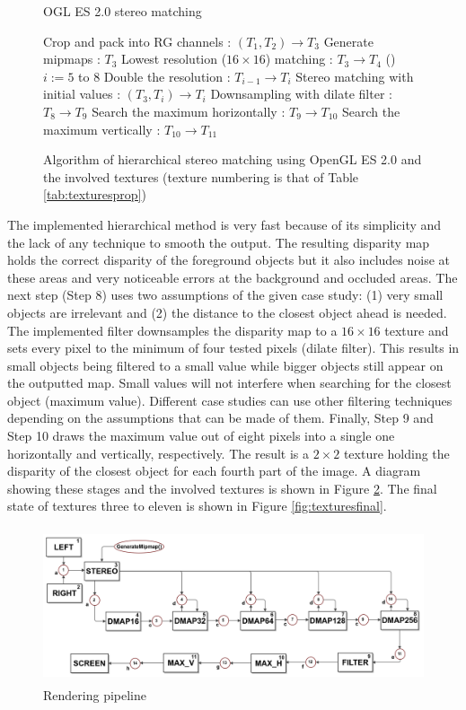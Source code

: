 \documentclass[conference]{IEEEtran}
\makeatletter
\newcommand{\removelatexerror}{\let\@latex@error\@gobble}
\makeatother
\begin{document}
\begin{figure}[!t]
\removelatexerror
\begin{algorithm}[H]
\caption{OGL ES 2.0 stereo matching}
	Crop and pack into RG channels : $(T_1, T_2)\rightarrow T_3$\;
	Generate mipmaps : $T_3$\;
	Lowest resolution ($16\times16$) matching : $T_3 \rightarrow T_4$\;
	\For(){$i := 5$ to $8$}
	{
		Double the resolution : $T_{i-1} \rightarrow T_i $\;
		Stereo matching with initial values : $(T_3, T_{i}) \rightarrow T_i$\;
	}
	Downsampling with dilate filter : $T_8 \rightarrow T_9$\;
	Search the maximum horizontally : $T_9 \rightarrow T_{10}$\;
	Search the maximum vertically : $T_{10} \rightarrow T_{11}$\;
\end{algorithm}
\caption{Algorithm of hierarchical stereo matching using OpenGL ES 2.0 and the involved textures (texture numbering is that of Table \ref{tab:texturesprop})}
\label{fig:alg:loop}
\end{figure}

The implemented hierarchical method is very fast because of its simplicity and the lack of any technique to smooth the output. The resulting disparity map holds the correct disparity of the foreground objects but it also includes noise at these areas and very noticeable errors at the background and occluded areas. The next step (Step 8) uses two assumptions of the given case study: (1) very small objects are irrelevant and (2) the distance to the closest object ahead is needed. The implemented filter downsamples the disparity map to a $16 \times 16$ texture and sets every pixel to the minimum of four tested pixels (dilate filter). This results in small objects being filtered to a small value while bigger objects still appear on the outputted map. Small values will not interfere when searching for the closest object (maximum value). Different case studies can use other filtering techniques depending on the assumptions that can be made of them. Finally, Step 9 and Step 10 draws the maximum value out of eight pixels into a single one horizontally and vertically, respectively. The result is a $2 \times 2$ texture holding the disparity of the closest object for each fourth part of the image. A diagram showing these stages and the involved textures is shown in Figure \ref{fig:pipeline}. The final state of textures three to eleven is shown in Figure \ref{fig:texturesfinal}.

\begin{figure}[!t]
\centering
\includegraphics[height=1.8in, width=6.5in]{pipeline}
\caption{Rendering pipeline}
\label{fig:pipeline}
\end{figure}
\end{document}
